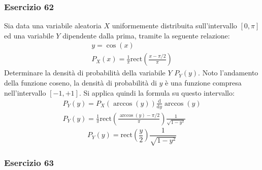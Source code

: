 \documentclass{article}
\newcommand{\rect}{\mathrm{rect}}
\newcommand{\df}{\mathrm{d}}
\begin{document}
\subsubsection*{Esercizio 62}

Sia data una variabile aleatoria $X$ uniformemente distribuita sull'intervallo $[0,\pi]$ ed una variabile $Y$ dipendente dalla prima, tramite la seguente relazione:
\begin{gather*}
    y=\cos(x)\\
    P_X(x)=\displaystyle\frac{1}{\pi}\rect\left(\frac{x-\pi/2}{\pi}\right)
\end{gather*}
Determinare la densità di probabilità della variabile $Y$ $P_Y(y)$. Noto l'andamento della funzione coseno, la densità di probabilità di $y$ è una funzione 
compresa nell'intervallo $[-1,+1]$. Si applica quindi la formula su questo intervallo:
\begin{gather*}
    P_Y(y)=P_X(\arccos(y))\displaystyle\frac{\df}{\df y}\arccos(y)\\
    P_Y(y)=\displaystyle\frac{1}{\pi}\rect\left(\frac{\arccos(y)-\pi/2}{\pi}\right)\frac{1}{\sqrt{1-y^2}}
\end{gather*}
\begin{equation}
    P_Y(y)=\displaystyle\rect\left(\frac{y}{2}\right)\frac{1}{\sqrt{1-y^2}}
\end{equation}

\subsubsection*{Esercizio 63}
\end{document}
